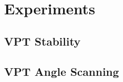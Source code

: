 \chapter{Experiments}

\section{VPT Stability}
\label{sec:vpt_stable}



\section{VPT Angle Scanning}
\label{sec:vpt_angle}




